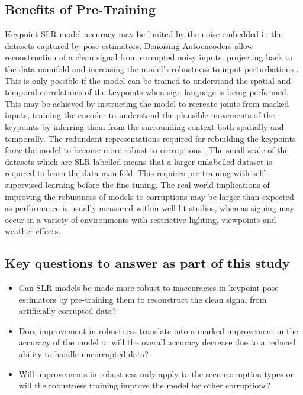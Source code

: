 \documentclass{article}
\begin{document}
\subsection{Benefits of Pre-Training}
Keypoint SLR model accuracy may be limited by the noise embedded in the datasets captured by pose estimators. Denoising Autoencoders allow reconstruction of a clean signal from corrupted noisy inputs, projecting back to the data manifold and increasing the model’s robustness to input perturbations \cite{vincent_extracting_2008}. This is only possible if the model can be trained to understand the spatial and temporal correlations of the keypoints when sign language is being performed. This may be achieved by instructing the model to recreate joints from masked inputs, training the encoder to understand the plausible movements of the keypoints by inferring them from the surrounding context both spatially and temporally. The redundant representations required for rebuilding the keypoints force the model to become more robust to corruptions \cite{vincent_extracting_2008}. The small scale of the datasets which are SLR labelled means that a larger unlabelled dataset is required to learn the data manifold. This requires pre-training with self-supervised learning before the fine tuning. 
The real-world implications of improving the robustness of models to corruptions may be larger than expected as performance is usually measured within well lit studios, whereas signing may occur in a variety of environments with restrictive lighting, viewpoints and weather effects. 
\newpage
\subsection{Key questions to answer as part of this study}
\begin{itemize}
\item Can SLR models be made more robust to inaccuracies in keypoint pose estimators by pre-training them to reconstruct the clean signal from artificially corrupted data? 
\item Does improvement in robustness translate into a marked improvement in the accuracy of the model or will the overall accuracy decrease due to a reduced ability to handle uncorrupted data? 
\item Will improvements in robustness only apply to the seen corruption types or will the robustness training improve the model for other corruptions? 
\end{itemize}
\newpage
\end{document}
